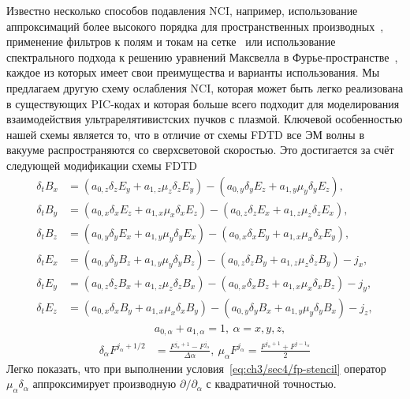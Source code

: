 Известно несколько способов подавления NCI, например, использование аппроксимаций более высокого порядка для пространственных производных~\cite{Lu2019, Xu2019, Li2020}, применение фильтров к полям и токам на сетке~\cite{greenwood2004elimination} или использование спектрального подхода к решению уравнений Максвелла в Фурье-пространстве~\cite{Yu2015}, каждое из которых имеет свои преимущества и варианты использования.
Мы предлагаем другую схему ослабления NCI, которая может быть легко реализована в существующих PIC-кодах и которая больше всего подходит для моделирования взаимодействия ультрарелятивистских пучков с плазмой.
Ключевой особенностью нашей схемы является то, что в отличие от схемы FDTD все ЭМ волны в вакууме распространяются со сверхсветовой скоростью.
Это достигается за счёт следующей модификации схемы FDTD
\begin{align}
    \label{eq:ch3/scheme1}
    \delta_t B_x&=(a_{0,z} \delta_zE_y + a_{1,z} \mu_z\delta_zE_y) - (a_{0,y} \delta_yE_z+a_{1,y} \mu_y\delta_y E_z)  ,\\
    \label{eq:ch3/scheme2}
    \delta_t B_y&=(a_{0,x} \delta_xE_z + a_{1,x} \mu_x\delta_xE_z) - (a_{0,z} \delta_zE_x+a_{1,z} \mu_z\delta_z E_x)  ,\\
    \label{eq:ch3/scheme3}
    \delta_t B_z&=(a_{0,y} \delta_yE_x + a_{1,y} \mu_y\delta_yE_x) - (a_{0,x} \delta_xE_y+a_{1,x} \mu_x\delta_x E_y)   ,\\
    \label{eq:ch3/scheme4}
    \delta_t E_x&=(a_{0,y} \delta_yB_z+a_{1,y} \mu_y\delta_yB_z) - (a_{0,z} \delta_zB_y + a_{1,z} \mu_z\delta_zB_y)-j_x ,\\
    \label{eq:ch3/scheme5}
    \delta_t E_y&=(a_{0,z} \delta_zB_x+a_{1,z} \mu_z\delta_zB_x) - (a_{0,x} \delta_xB_z + a_{1,x} \mu_x\delta_xB_z)-j_y ,\\
    \label{eq:ch3/scheme6}
    \delta_t E_z&=(a_{0,x} \delta_xB_y+a_{1,x} \mu_x\delta_xB_y) - (a_{0,y} \delta_yB_x + a_{1,y} \mu_y\delta_yB_x)-j_z ,
\end{align}
\begin{align}
    \label{eq:ch3/sec4/fp-stencil}
    & a_{0,\alpha}+a_{1,\alpha}=1,\ \alpha=x,y,z, \\
    \delta_\alpha F^{j_\alpha+1/2} &= \frac{F^{j_\alpha+1}-F^{j_\alpha}}{\Delta\alpha} ,\ \mu_\alpha F^{j_\alpha} = \frac{F^{j_\alpha+1}+F^{j-1_\alpha}}{2}
\end{align}
Легко показать, что при выполнении условия~\eqref{eq:ch3/sec4/fp-stencil} оператор $\mu_\alpha\delta_\alpha$ аппроксимирует производную $\partial/\partial_\alpha$ с квадратичной точностью.

